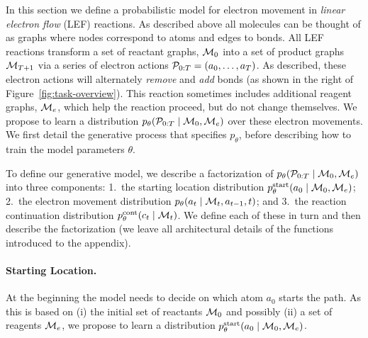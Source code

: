 


In this section we define a probabilistic model for electron movement in \emph{linear electron flow} (LEF) reactions.
As described above all molecules can be thought of as graphs where nodes correspond to atoms and edges to bonds. All LEF reactions transform a set of reactant graphs, ${\mathcal{M}}_0$ into a set of product graphs ${\mathcal{M}}_{T+1}$ via a series of electron actions ${\mathcal{P}}_{0:T} = (a_0, \dots, a_{T})$.  As described, these electron actions will alternately \emph{remove} and \emph{add} bonds (as shown in the right of Figure~\ref{fig:task-overview}). This reaction sometimes includes additional reagent graphs, ${\mathcal{M}}_e$, which help the reaction proceed, but do not change themselves.
We propose to learn a distribution $p_\theta( {\mathcal{P}}_{0:T} \mid {\mathcal{M}}_0, {\mathcal{M}}_e)$ over these electron movements. 
We first detail the generative process %
that specifies $p_\theta$, before describing how to train the model parameters $\theta$.




To define our generative model, we describe a factorization of $p_\theta( {\mathcal{P}}_{0:T} \mid {\mathcal{M}}_0, {\mathcal{M}}_e)$ into three components: 1.\ the starting location distribution $p_\theta^{\mathrm{start}}(a_0 \mid {\mathcal{M}}_0, {\mathcal{M}}_e)$; 2.\ the electron movement distribution $p_\theta(a_t \mid {\mathcal{M}}_{t}, a_{t-1}, t)$; and 3.\ the reaction continuation distribution $p^\textrm{cont}_\theta(c_{t} \mid {\mathcal{M}}_{t})$. We define each of these in turn and then describe the factorization (we leave all architectural details of the functions introduced to the appendix).

\paragraph{Starting Location.}
At the beginning the model needs to decide on which atom $a_0$ starts the path.
As this is based on (i) the initial set of reactants ${\mathcal{M}}_0$ and possibly (ii) a set of reagents ${\mathcal{M}}_e$,
we propose to learn a distribution $p_\theta^{\mathrm{start}}(a_0 \mid {\mathcal{M}}_0, {\mathcal{M}}_e)$.

